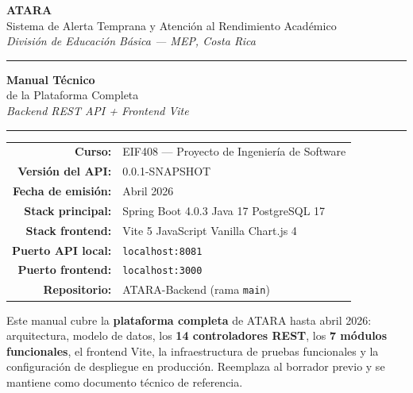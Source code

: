 \documentclass[11pt,a4paper,oneside]{article}
\newcommand{\code}[1]{\texttt{\small #1}}
\begin{document}
\thispagestyle{empty}

\begin{center}
\vspace*{1.5cm}

{\Huge\bfseries\color{ataraAzul} ATARA}\\[0.5em]
{\Large Sistema de Alerta Temprana y Atención al Rendimiento Académico}\\[0.4em]
{\normalsize\itshape División de Educación Básica — MEP, Costa Rica}

\vspace{2.2cm}
\rule{0.85\linewidth}{1.5pt}

\vspace{0.7cm}
{\Huge\bfseries Manual Técnico}\\[0.4em]
{\Large de la Plataforma Completa}\\[0.4em]
{\large\itshape Backend REST API + Frontend Vite}

\vspace{0.5cm}
\rule{0.85\linewidth}{1.5pt}

\vspace{2.5cm}

\begin{tabular}{rl}
\textbf{Curso:}              & EIF408 — Proyecto de Ingeniería de Software \\[0.2em]
\textbf{Versión del API:}    & 0.0.1-SNAPSHOT \\[0.2em]
\textbf{Fecha de emisión:}   & Abril 2026 \\[0.2em]
\textbf{Stack principal:}    & Spring Boot 4.0.3 \textperiodcentered{} Java 17 \textperiodcentered{} PostgreSQL 17 \\[0.2em]
\textbf{Stack frontend:}     & Vite 5 \textperiodcentered{} JavaScript Vanilla \textperiodcentered{} Chart.js 4 \\[0.2em]
\textbf{Puerto API local:}   & \code{localhost:8081} \\[0.2em]
\textbf{Puerto frontend:}    & \code{localhost:3000} \\[0.2em]
\textbf{Repositorio:}        & ATARA-Backend (rama \code{main}) \\
\end{tabular}

\vspace{1.5cm}

\begin{ataracaja}[title=Alcance del documento]
Este manual cubre la \textbf{plataforma completa} de ATARA hasta abril 2026: arquitectura,
modelo de datos, los \textbf{14 controladores REST}, los \textbf{7 módulos funcionales},
el frontend Vite, la infraestructura de pruebas funcionales y la configuración de despliegue
en producción. Reemplaza al borrador previo y se mantiene como documento técnico de referencia.
\end{ataracaja}

\end{center}
\newpage
\end{document}

